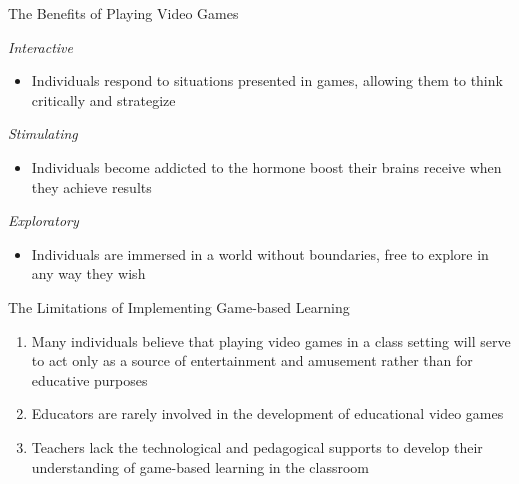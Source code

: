 \documentclass{beamer}
\begin{document}

	\begin{frame}{The Benefits of Playing Video Games}
		
		\begin{block}{\textit{Interactive}}
			 \begin{itemize}
			 \item Individuals respond to situations presented in games, allowing them to think critically and strategize
			 \end{itemize}
		\end{block} \pause
	
		\begin{block}{\textit{Stimulating}}
			\begin{itemize}
				\item Individuals become addicted to the hormone boost their brains receive when they achieve results
			\end{itemize}
		\end{block} \pause
	
		\begin{block}{\textit{Exploratory}}
			\begin{itemize}
				\item Individuals are immersed in a world without boundaries, free to explore in any way they wish
			\end{itemize}
		\end{block}
	
	
	\end{frame}

	\begin{frame}{The Limitations of Implementing Game-based Learning}
		\begin{enumerate}
			\item Many individuals believe that playing video games in a class setting will serve to act only as a source of entertainment and amusement rather than for educative purposes \newline 
			\item Educators are rarely involved in the development of educational video games \newline
			\item Teachers lack the technological and pedagogical supports to develop their understanding of game-based learning in the classroom 
			
		\end{enumerate}
	
		
	\end{frame}
\end{document}
